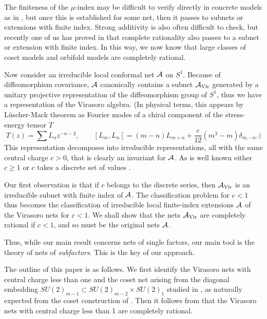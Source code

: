 \documentclass[12pt]{article}
\def\Vir{{\rm Vir}}
\def\A{{\cal A}}
\begin{document}
The finiteness of the $\mu$-index may be difficult to verify directly
in concrete models as in \cite{X3}, but once this is established for 
some net, then it passes to subnets or extensions with finite index.  
Strong additivity is also often difficult to check, but recently 
one of us has proved in \cite{L4} that complete rationality 
also passes to a subnet or extension with finite index.
In this way, we now know that large classes of coset models 
\cite{X4} and orbifold models \cite{X7} are completely rational.

Now consider an irreducible local conformal net $\A$ on $S^1$. Because 
of diffeomorphism covariance, $\A$ canonically contains a subnet 
$\A_{\Vir}$
generated by a unitary projective representation of the diffeomorphism 
group of $S^1$, thus we have a representation of the Virasoro 
algebra. (In physical terms, this appears by L\"{u}scher-Mack theorem 
as Fourier modes of a chiral component of the stress-energy tensor $T$
\begin{equation*}
T(z)=\sum L_n z^{-n-2},\qquad
[L_m,L_n]=(m-n) L_{m+n} + \frac{c}{12}(m^3-m)\delta_{m,-n}.)
\end{equation*}
This representation 
decomposes into irreducible representations, all with the same 
central charge $c>0$, that is clearly an invariant for $\A$.
As is well known either $c\geq 1$ or $c$ takes a discrete set of 
values \cite{FQS}.

Our first observation is that if 
$c$ belongs to the discrete 
series, then $\A_{\Vir}$ is an irreducible subnet with finite index of 
$\A$. The classification problem for $c<1$ thus becomes the classification 
of irreducible local finite-index extensions $\A$ of the 
Virasoro nets for $c<1$. We shall show that the nets $\A_{\Vir}$ are 
completely rational if $c<1$, and so must be the original nets $\A$.

Thus, while our main result concerns nets of single factors, our main 
tool is the theory of nets of {\sl subfactors}. This is the key of our 
approach.

The outline of this paper is as follows.
We first identify the Virasoro nets with central charge less than one
and the coset net arising from the diagonal
embedding $SU(2)_{m-1}\subset SU(2)_{m-2}\times SU(2)_1$ studied in
\cite{X4}, as naturally expected from the  coset construction
of \cite{GKO}.
Then it follows from \cite{L4} that the Virasoro nets with central
charge less than 1 are completely rational.
\end{document}
